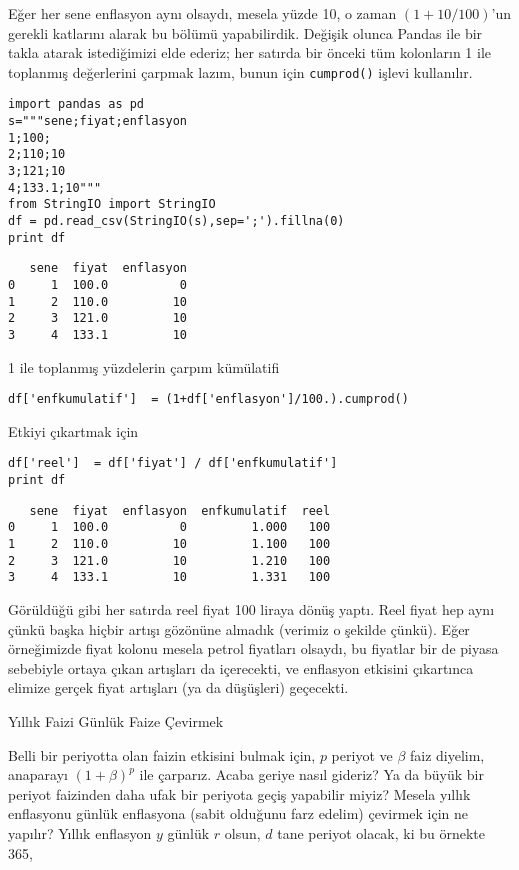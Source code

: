 \documentclass[12pt,fleqn]{article}\usepackage{../../common}
\begin{document}
Eğer her sene enflasyon aynı olsaydı, mesela yüzde 10, o zaman
$(1+10/100)$'un gerekli katlarını alarak bu bölümü yapabilirdik. Değişik
olunca Pandas ile bir takla atarak istediğimizi elde ederiz; her satırda
bir önceki tüm kolonların 1 ile toplanmış değerlerini çarpmak lazım, bunun
için \verb!cumprod()! işlevi kullanılır.

\begin{verbatim}
import pandas as pd
s="""sene;fiyat;enflasyon
1;100;
2;110;10   
3;121;10   
4;133.1;10"""
from StringIO import StringIO
df = pd.read_csv(StringIO(s),sep=';').fillna(0)
print df
\end{verbatim}

\begin{verbatim}
   sene  fiyat  enflasyon
0     1  100.0          0
1     2  110.0         10
2     3  121.0         10
3     4  133.1         10
\end{verbatim}

1 ile toplanmış yüzdelerin çarpım kümülatifi

\begin{verbatim}
df['enfkumulatif']  = (1+df['enflasyon']/100.).cumprod()
\end{verbatim}

Etkiyi çıkartmak için

\begin{verbatim}
df['reel']  = df['fiyat'] / df['enfkumulatif']
print df
\end{verbatim}

\begin{verbatim}
   sene  fiyat  enflasyon  enfkumulatif  reel
0     1  100.0          0         1.000   100
1     2  110.0         10         1.100   100
2     3  121.0         10         1.210   100
3     4  133.1         10         1.331   100
\end{verbatim}

Görüldüğü gibi her satırda reel fiyat 100 liraya dönüş yaptı. Reel fiyat
hep aynı çünkü başka hiçbir artışı gözönüne almadık (verimiz o şekilde
çünkü). Eğer örneğimizde fiyat kolonu mesela petrol fiyatları olsaydı, bu
fiyatlar bir de piyasa sebebiyle ortaya çıkan artışları da içerecekti, ve
enflasyon etkisini çıkartınca elimize gerçek fiyat artışları (ya da
düşüşleri) geçecekti.

Yıllık Faizi Günlük Faize Çevirmek

Belli bir periyotta olan faizin etkisini bulmak için, $p$ periyot ve $\beta$
faiz diyelim, anaparayı $(1+\beta)^p$ ile çarparız. Acaba geriye nasıl gideriz?
Ya da büyük bir periyot faizinden daha ufak bir periyota geçiş yapabilir miyiz?
Mesela yıllık enflasyonu günlük enflasyona (sabit olduğunu farz edelim) çevirmek
için ne yapılır? Yıllık enflasyon $y$ günlük $r$ olsun, $d$ tane periyot olacak,
ki bu örnekte 365,
\end{document}
